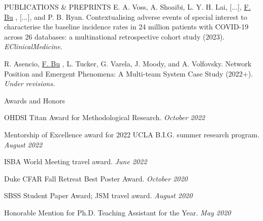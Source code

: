 \documentclass{resume} %
\newcommand{\myName}[1]{
	\underline{#1}
}
\begin{document}
\begin{rSection}{PUBLICATIONS \& PREPRINTS}
E. A. Voss, A. Shoaibi, L. Y. H. Lai,  [...], \myName{F. Bu}, [...], and P. B. Ryan. Contextualising adverse events of special interest to characterise the baseline incidence rates in 24 million patients with COVID-19 across 26 databases: a multinational retrospective cohort study (2023). \emph{EClinicalMedicine}. 


\smallskip

R. Asencio, \myName{F. Bu}, L. Tucker, G. Varela, J. Moody, and A. Volfovsky. 
Network Position and Emergent Phenomena: A Multi-team System Case Study (2022+). \emph{Under revisions.}




\end{rSection}




%


\begin{rSection}{Awards and Honors}

OHDSI Titan Award for Methodological Research. 
\hfill {\em October 2022}

Mentorship of Excellence award for 2022 UCLA B.I.G. summer research program. \hfill {\em August 2022}

ISBA World Meeting travel award.
\hfill {\em June 2022}

Duke CFAR Fall Retreat Best Poster Award. 
\hfill {\em October 2020}

SBSS Student Paper Award; JSM travel award. \hfill {\em August 2020}

Honorable Mention for Ph.D. Teaching Assistant for the Year. 
\hfill {\em May 2020}


\end{rSection}


\end{document}
